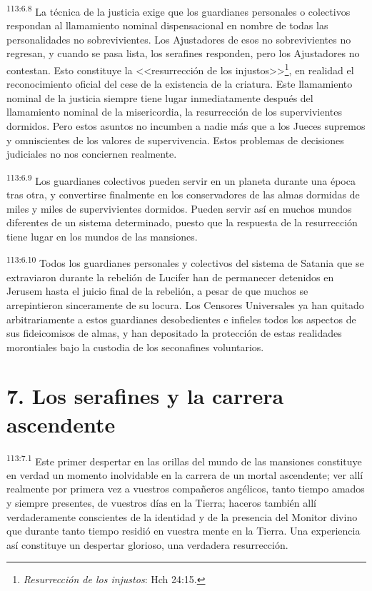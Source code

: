 \par
\textsuperscript{113:6.8} La técnica de la justicia exige que los guardianes personales o colectivos respondan al llamamiento nominal dispensacional en nombre de todas las personalidades no sobrevivientes. Los Ajustadores de esos no sobrevivientes no regresan, y cuando se pasa lista, los serafines responden, pero los Ajustadores no contestan. Esto constituye la <<resurrección de los injustos>>\footnote{\textit{Resurrección de los injustos}: Hch 24:15.}, en realidad el reconocimiento oficial del cese de la existencia de la criatura. Este llamamiento nominal de la justicia siempre tiene lugar inmediatamente después del llamamiento nominal de la misericordia, la resurrección de los supervivientes dormidos. Pero estos asuntos no incumben a nadie más que a los Jueces supremos y omniscientes de los valores de supervivencia. Estos problemas de decisiones judiciales no nos conciernen realmente.

\par
\textsuperscript{113:6.9} Los guardianes colectivos pueden servir en un planeta durante una época tras otra, y convertirse finalmente en los conservadores de las almas dormidas de miles y miles de supervivientes dormidos. Pueden servir así en muchos mundos diferentes de un sistema determinado, puesto que la respuesta de la resurrección tiene lugar en los mundos de las mansiones.

\par
\textsuperscript{113:6.10} Todos los guardianes personales y colectivos del sistema de Satania que se extraviaron durante la rebelión de Lucifer han de permanecer detenidos en Jerusem hasta el juicio final de la rebelión, a pesar de que muchos se arrepintieron sinceramente de su locura. Los Censores Universales ya han quitado arbitrariamente a estos guardianes desobedientes e infieles todos los aspectos de sus fideicomisos de almas, y han depositado la protección de estas realidades morontiales bajo la custodia de los seconafines voluntarios.

\section*{7. Los serafines y la carrera ascendente}
\par
\textsuperscript{113:7.1} Este primer despertar en las orillas del mundo de las mansiones constituye en verdad un momento inolvidable en la carrera de un mortal ascendente; ver allí realmente por primera vez a vuestros compañeros angélicos, tanto tiempo amados y siempre presentes, de vuestros días en la Tierra; haceros también allí verdaderamente conscientes de la identidad y de la presencia del Monitor divino que durante tanto tiempo residió en vuestra mente en la Tierra. Una experiencia así constituye un despertar glorioso, una verdadera resurrección.

